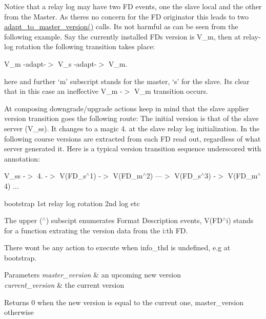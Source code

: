 Notice that a relay log may have two FD events, one the slave local and the other from the Master. As there\textquotesingle{}s no concern for the FD originator this leads to two \mbox{\hyperlink{classRelay__log__info_a882c4b69a10aec9768aac5a01fad52d7}{adapt\+\_\+to\+\_\+master\+\_\+version()}} calls. It\textquotesingle{}s not harmful as can be seen from the following example. Say the currently installed FD\textquotesingle{}s version is V\+\_\+m, then at relay-\/log rotation the following transition takes place\+:

V\+\_\+m -\/adapt-\/$>$ V\+\_\+s -\/adapt-\/$>$ V\+\_\+m.

here and further `m' subscript stands for the master, `s' for the slave. It\textquotesingle{}s clear that in this case an ineffective V\+\_\+m -\/$>$ V\+\_\+m transition occurs.

At composing downgrade/upgrade actions keep in mind that the slave applier version transition goes the following route\+: The initial version is that of the slave server (V\+\_\+ss). It changes to a magic 4. at the slave relay log initialization. In the following course versions are extracted from each FD read out, regardless of what server generated it. Here is a typical version transition sequence underscored with annotation\+:

V\+\_\+ss -\/$>$ 4. -\/$>$ V(\+F\+D\+\_\+s$^\wedge$1) -\/$>$ V(\+F\+D\+\_\+m$^\wedge$2) ---$>$ V(\+F\+D\+\_\+s$^\wedge$3) -\/$>$ V(\+F\+D\+\_\+m$^\wedge$4) ...



 bootstrap 1st relay log rotation 2nd log etc

The upper ($^\wedge$) subscipt enumerates Format Description events, V(\+F\+D$^\wedge$i) stands for a function extrating the version data from the i\+:th FD.

There won\textquotesingle{}t be any action to execute when info\+\_\+thd is undefined, e.\+g at bootstrap.


\begin{DoxyParams}{Parameters}
{\em master\+\_\+version} & an upcoming new version \\
\hline
{\em current\+\_\+version} & the current version \\
\hline
\end{DoxyParams}
\begin{DoxyReturn}{Returns}
0 when the new version is equal to the current one, master\+\_\+version otherwise 
\end{DoxyReturn}
\mbox{\label{classRelay__log__info_a514a40d969720a66682e708c96d95f83}} 
